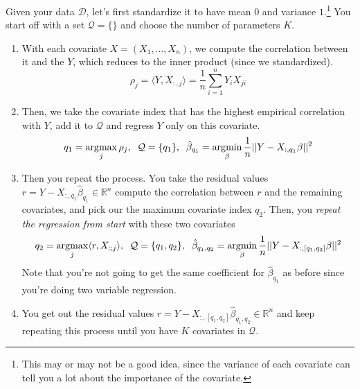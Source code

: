   \begin{definition}
    Given your data $\mathcal{D}$, let's first standardize it to have mean $0$ and variance $1$.\footnote{This may or may not be a good idea, since the variance of each covariate can tell you a lot about the importance of the covariate.} You start off with a set $\mathcal{Q} = \{\}$ and choose the number of parameters $K$. 
    \begin{enumerate}
      \item With each covariate $X = (X_1, \ldots, X_n)$, we compute the correlation between it and the $Y$, which reduces to the inner product (since we standardized). 
      \begin{equation}
        \rho_j = \langle Y, X_{:, j} \rangle = \frac{1}{n} \sum_{i=1}^n Y_i X_{ji}
      \end{equation}

      \item Then, we take the covariate index that has the highest empirical correlation with $Y$, add it to $\mathcal{Q}$ and regress $Y$ only on this covariate. 
      \begin{equation}
        q_1 = \operatorname*{\arg\!\max}_j \rho_j , \;\; \mathcal{Q} = \{q_1\}, \;\; \hat{\beta}_{q_1} = \operatorname*{\arg\!\min}_{\beta} \frac{1}{n} ||Y - X_{:, q_1} \beta||^2 
      \end{equation}

      \item Then you repeat the process. You take the residual values $r = Y - X_{:, q_1} \hat{\beta}_{q_1} \in \mathbb{R}^n$ compute the correlation between $r$ and the remaining covariates, and pick our the maximum covariate index $q_2$. Then, you \textit{repeat the regression from start} with these two covariates 
      \begin{equation}
        q_2 = \operatorname*{\arg\!\max}_j \langle r, X_{: ; j} \rangle , \;\; \mathcal{Q} = \{q_1, q_2\}, \;\; \hat{\beta}_{q_1, q_2} = \operatorname*{\arg\!\min}_{\beta} \frac{1}{n} ||Y - X_{:,[q_1, q_2]} \beta||^2
      \end{equation}
      Note that you're not going to get the same coefficient for $\hat{\beta}_{q_1}$ as before since you're doing two variable regression. 

      \item You get out the residual values $r = Y - X_{:, [q_1, q_2]} \hat{\beta}_{q_1, q_2} \in \mathbb{R}^n$ and keep repeating this process until you have $K$ covariates in $\mathcal{Q}$. 
    \end{enumerate}
  \end{definition}

